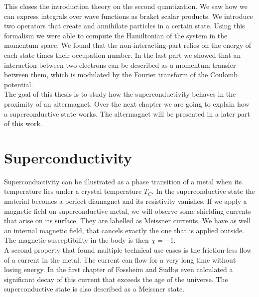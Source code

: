 \documentclass[../main.tex]{subfile}
\begin{document}
This closes the introduction theory on the second quantization. We saw how we can express integrals over wave functions as braket scalar products. 
We introduce two operators that create and annihilate particles in a certain state. Using this formalism we were able to compute the 
Hamiltonian of the system in the momentum space. We found that the non-interacting-part relies on the energy of each state times their occupation number.
In the last part we showed that an interaction between two electrons can be described as a momentum transfer between them,
 which is modulated by the Fourier transform of the Coulomb potential.\\

The goal of this thesis is to study how the superconductivity behaves in the proximity of an altermagnet. 
Over the next chapter we are going to explain how a superconductive state works. The altermagnet will be presented in a later part of this work.\\

\section{Superconductivity}
Superconductivity can be illustrated as a phase transition of a metal when its temperature lies under a crystal temperature $T_C$. In the superconductive state the material 
becomes a perfect diamagnet and its resistivity vanishes. If we apply a magnetic field on superconductive metal, we will observe some shielding currents that arise on its surface.
They are labelled as Meissner currents. We have as well an internal magnetic field, that cancels exactly the one
that is applied outside. The magnetic susceptibility in the body is then $\chi = -1$.\\
A second property that found multiple technical use cases is the friction-less flow of a current in the metal. The current can flow for a very long time without losing energy. 
In the first chapter of \cite{FossheimSudbo2004} Fossheim and Sudbø even calculated a significant decay of this current that exceeds the age of the universe.
The superconductive state is also described as a Meissner state.\\ 
\end{document}

